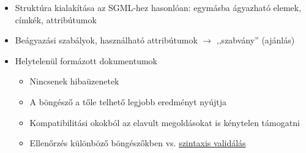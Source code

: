 \documentclass[usenames,dvipsnames,aspectratio=169]{beamer}
\newcommand{\hiv}[1]{{\color{hivatkozasszin}#1}}
\begin{document}
\begin{frame}
  \begin{itemize}
    \item Struktúra kialakítása az SGML-hez hasonlóan: egymásba ágyazható elemek, címkék, attribútumok
    \item Beágyazási szabályok, használható attribútumok $\to$ ,,szabvány'' (ajánlás)
    \item Helytelenül formázott dokumentumok
    \begin{itemize}
      \item Nincsenek hibaüzenetek
      \item A böngésző a tőle telhető legjobb eredményt nyújtja
      \item Kompatibilitási okokból az elavult megoldásokat is kénytelen támogatni
      \item Ellenőrzés különböző böngészőkben vs. \hiv{\href{https://validator.w3.org/}{szintaxis validálás}}
    \end{itemize}
  \end{itemize}
\end{frame}
\end{document}
